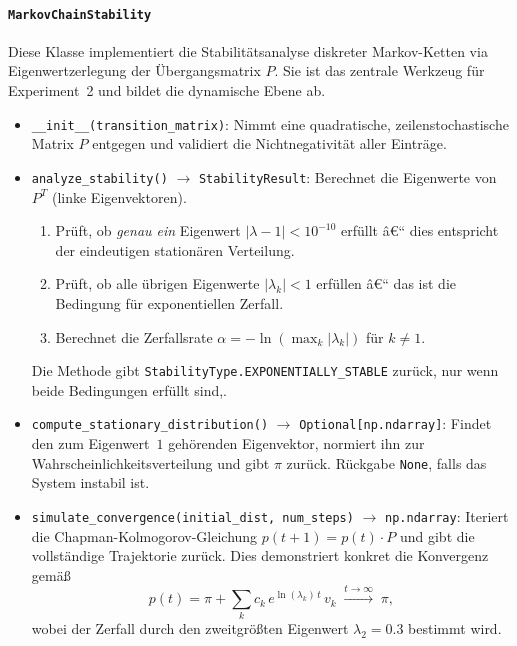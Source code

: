 ﻿\documentclass[a4paper,12pt]{report}
\theoremstyle{definition}
\begin{document}
\paragraph{\texttt{MarkovChainStability}}

Diese Klasse implementiert die Stabilitätsanalyse diskreter
Markov-Ketten via Eigenwertzerlegung der Übergangsmatrix $P$.  Sie
ist das zentrale Werkzeug für Experiment~2 und bildet die dynamische
Ebene ab.

\begin{itemize}
	\item \texttt{\_\_init\_\_(transition\_matrix)}: Nimmt eine
	quadratische, zeilenstochastische Matrix $P$ entgegen und
	validiert die Nichtnegativität aller Einträge.
	
	\item \texttt{analyze\_stability()} $\to$ \texttt{StabilityResult}:
	Berechnet die Eigenwerte von $P^T$ (linke Eigenvektoren).
	\begin{enumerate}
		\item Prüft, ob \emph{genau ein} Eigenwert
		$|\lambda - 1| < 10^{-10}$ erfüllt â€“ dies
		entspricht der eindeutigen stationären Verteilung.
		\item Prüft, ob alle übrigen Eigenwerte $|\lambda_k| < 1$
		erfüllen â€“ das ist die Bedingung für exponentiellen
		Zerfall.
		\item Berechnet die Zerfallsrate
		$\alpha = -\ln(\max_k |\lambda_k|)$ für $k \neq 1$.
	\end{enumerate}
	Die Methode gibt \texttt{StabilityType.EXPONENTIALLY\_STABLE} zurück, nur wenn beide Bedingungen erfüllt sind,.
	
	\item \texttt{compute\_stationary\_distribution()} $\to$
	\texttt{Optional[np.ndarray]}:  Findet den zum Eigenwert~$1$
	gehörenden Eigenvektor, normiert ihn zur
	Wahrscheinlichkeitsverteilung und gibt $\pi$ zurück.
	Rückgabe \texttt{None}, falls das System instabil ist.
	
	\item \texttt{simulate\_convergence(initial\_dist, num\_steps)}
	$\to$ \texttt{np.ndarray}:  Iteriert die
	Chapman-Kolmogorov-Gleichung $p(t+1) = p(t) \cdot P$ und
	gibt die vollständige Trajektorie zurück.  Dies demonstriert
	konkret die Konvergenz gemäß
	\[
	p(t) = \pi + \sum_{k} c_k\, e^{\ln(\lambda_k)\,t}\, v_k
	\;\xrightarrow{t\to\infty}\; \pi,
	\]
	wobei der Zerfall durch den zweitgrößten Eigenwert
	$\lambda_2 = 0.3$ bestimmt wird.
\end{itemize}
\end{document}
